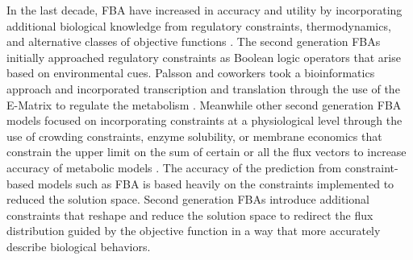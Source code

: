 \documentclass[12pt]{article}
\begin{document}
In the last decade, FBA have increased in accuracy and utility by incorporating additional biological knowledge from regulatory constraints, thermodynamics, and alternative classes of objective functions \cite{kauffman2003advances}. The second generation FBAs initially approached regulatory constraints as Boolean logic operators \cite{covert2002transcriptional} that arise based on environmental cues. Palsson and coworkers took a bioinformatics approach and incorporated transcription and translation through the use of the E-Matrix to regulate the metabolism \cite{thiele2009genome}. Meanwhile other second generation FBA models focused on incorporating constraints at a physiological level through the use of crowding constraints, enzyme solubility, or membrane economics that constrain the upper limit on the sum of certain or all the flux vectors to increase accuracy of metabolic models \cite{beg2007intracellular,shlomi2011genome,zhuang2011economics}. The accuracy of the prediction from constraint-based models such as FBA is based heavily on the constraints implemented to reduced the solution space. Second generation FBAs introduce additional constraints that reshape and reduce the solution space to redirect the flux distribution guided by the objective function in a way that more accurately describe biological behaviors. 
\end{document}
